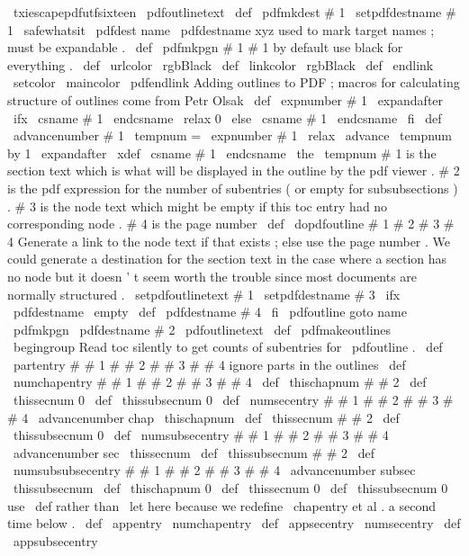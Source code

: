 {{{\
txiescapepdfutfsixteen
\
pdfoutlinetext
}
}
%
\
def
\
pdfmkdest
#
1
{
%
\
setpdfdestname
{
#
1
}
%
\
safewhatsit
{
\
pdfdest
name
{
\
pdfdestname
}
xyz
}
%
}
%
%
used
to
mark
target
names
;
must
be
expandable
.
\
def
\
pdfmkpgn
#
1
{
#
1
}
%
%
by
default
use
black
for
everything
.
\
def
\
urlcolor
{
\
rgbBlack
}
\
def
\
linkcolor
{
\
rgbBlack
}
\
def
\
endlink
{
\
setcolor
{
\
maincolor
}
\
pdfendlink
}
%
%
Adding
outlines
to
PDF
;
macros
for
calculating
structure
of
outlines
%
come
from
Petr
Olsak
\
def
\
expnumber
#
1
{
\
expandafter
\
ifx
\
csname
#
1
\
endcsname
\
relax
0
%
\
else
\
csname
#
1
\
endcsname
\
fi
}
\
def
\
advancenumber
#
1
{
\
tempnum
=
\
expnumber
{
#
1
}
\
relax
\
advance
\
tempnum
by
1
\
expandafter
\
xdef
\
csname
#
1
\
endcsname
{
\
the
\
tempnum
}
}
%
%
#
1
is
the
section
text
which
is
what
will
be
displayed
in
the
%
outline
by
the
pdf
viewer
.
#
2
is
the
pdf
expression
for
the
number
%
of
subentries
(
or
empty
for
subsubsections
)
.
#
3
is
the
node
text
%
which
might
be
empty
if
this
toc
entry
had
no
corresponding
node
.
%
#
4
is
the
page
number
%
\
def
\
dopdfoutline
#
1
#
2
#
3
#
4
{
%
%
Generate
a
link
to
the
node
text
if
that
exists
;
else
use
the
%
page
number
.
We
could
generate
a
destination
for
the
section
%
text
in
the
case
where
a
section
has
no
node
but
it
doesn
'
t
%
seem
worth
the
trouble
since
most
documents
are
normally
structured
.
\
setpdfoutlinetext
{
#
1
}
\
setpdfdestname
{
#
3
}
\
ifx
\
pdfdestname
\
empty
\
def
\
pdfdestname
{
#
4
}
%
\
fi
%
\
pdfoutline
goto
name
{
\
pdfmkpgn
{
\
pdfdestname
}
}
#
2
{
\
pdfoutlinetext
}
%
}
%
\
def
\
pdfmakeoutlines
{
%
\
begingroup
%
Read
toc
silently
to
get
counts
of
subentries
for
\
pdfoutline
.
\
def
\
partentry
#
#
1
#
#
2
#
#
3
#
#
4
{
}
%
ignore
parts
in
the
outlines
\
def
\
numchapentry
#
#
1
#
#
2
#
#
3
#
#
4
{
%
\
def
\
thischapnum
{
#
#
2
}
%
\
def
\
thissecnum
{
0
}
%
\
def
\
thissubsecnum
{
0
}
%
}
%
\
def
\
numsecentry
#
#
1
#
#
2
#
#
3
#
#
4
{
%
\
advancenumber
{
chap
\
thischapnum
}
%
\
def
\
thissecnum
{
#
#
2
}
%
\
def
\
thissubsecnum
{
0
}
%
}
%
\
def
\
numsubsecentry
#
#
1
#
#
2
#
#
3
#
#
4
{
%
\
advancenumber
{
sec
\
thissecnum
}
%
\
def
\
thissubsecnum
{
#
#
2
}
%
}
%
\
def
\
numsubsubsecentry
#
#
1
#
#
2
#
#
3
#
#
4
{
%
\
advancenumber
{
subsec
\
thissubsecnum
}
%
}
%
\
def
\
thischapnum
{
0
}
%
\
def
\
thissecnum
{
0
}
%
\
def
\
thissubsecnum
{
0
}
%
%
%
use
\
def
rather
than
\
let
here
because
we
redefine
\
chapentry
et
%
al
.
a
second
time
below
.
\
def
\
appentry
{
\
numchapentry
}
%
\
def
\
appsecentry
{
\
numsecentry
}
%
\
def
\
appsubsecentry
}}
